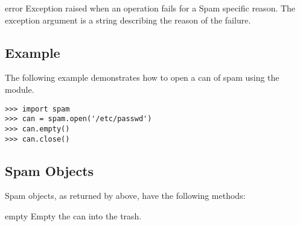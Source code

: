 
\begin{excdesc}{error}
Exception raised when an operation fails for a Spam specific reason.
The exception argument is a string describing the reason of the
failure.
\end{excdesc}

%



\subsection{Example \label{spam-example}}

The following example demonstrates how to open a can of spam using the
 module.

\begin{verbatim}
>>> import spam
>>> can = spam.open('/etc/passwd')
>>> can.empty()
>>> can.close()
\end{verbatim}


\subsection{Spam Objects}
\label{spam-objects}

Spam objects, as returned by  above, have the
following methods:

\begin{methoddesc}[spam]{empty}{}
Empty the can into the trash.
\end{methoddesc}
